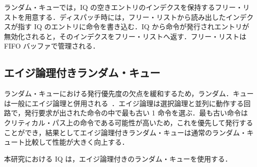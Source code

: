 ランダム・キューでは，IQ の空きエントリのインデクスを保持するフリー・リストを用意する．ディスパッチ時には，フリー・リストから読み出したインデクスが指す IQ のエントリに命令を書き込む．IQ から命令が発行されエントリが無効化されると，そのインデクスをフリー・リストへ返す．フリー・リストは FIFO バッファで管理される．

\subsection{エイジ論理付きランダム・キュー}
ランダム・キューにおける発行優先度の欠点を緩和するため，ランダム．キューは一般にエイジ論理と併用される~\cite{Alpha21464}．エイジ論理は選択論理と並列に動作する回路で，発行要求が出された命令の中で最も古い 1 命令を選ぶ．最も古い命令はクリティカル・パス上の命令である可能性が高いため，これを優先して発行することができ，結果としてエイジ論理付きランダム・キューは通常のランダム・キュート比較して性能が大きく向上する．

本研究における IQ は，エイジ論理付きのランダム・キューを使用する．



















